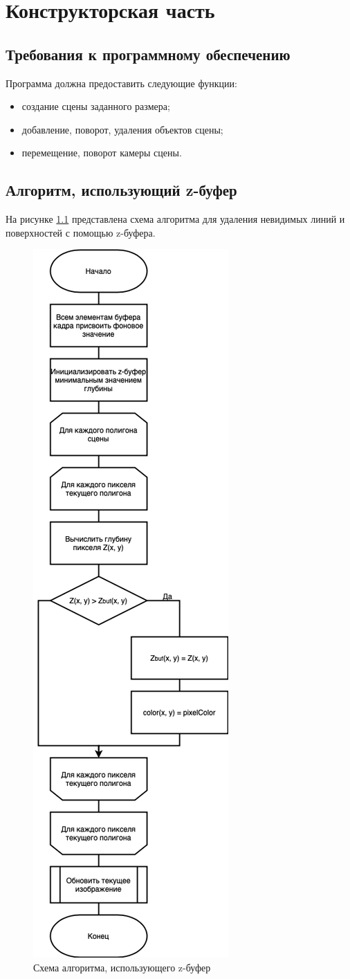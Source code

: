 \chapter{Конструкторская часть}

\section{Требования к программному обеспечению}

Программа должна предоставить следующие функции:
\begin{itemize}
    \item создание сцены заданного размера;
    \item добавление, поворот, удаления объектов сцены;
    \item перемещение, поворот камеры сцены.
\end{itemize}

\section{Алгоритм, использующий z-буфер}

На рисунке \ref{img:zbuf} представлена схема алгоритма для удаления 
невидимых линий и поверхностей с помощью z-буфера. 

\clearpage
\begin{figure}[h]
    \centering
    \includegraphics[width=0.4\linewidth]{img/zbuf.png}
    \caption{Схема алгоритма, использующего z-буфер}
    \label{img:zbuf}
\end{figure}
\noindent

